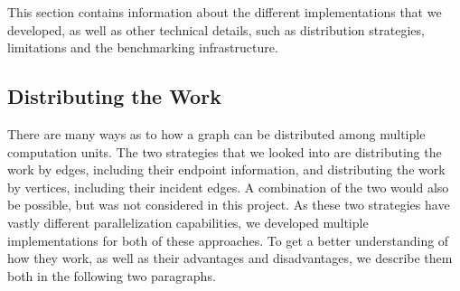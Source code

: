 \documentclass[letterpaper]{article}
\begin{document}


This section contains information about the different implementations that we developed, as well as other technical
details, such as distribution strategies, limitations and the benchmarking infrastructure.

\subsection{Distributing the Work}
There are many ways as to how a graph can be distributed among multiple computation units. The two strategies that we
looked into are distributing the work by edges, including their endpoint information, and distributing the work by
vertices, including their incident edges. A combination of the two would also be possible, but was not considered in
this project. As these two strategies have vastly different parallelization capabilities, we developed multiple
implementations for both of these approaches. To get a better understanding of how they work, as well as their
advantages and disadvantages, we describe them both in the following two paragraphs.
\end{document}

